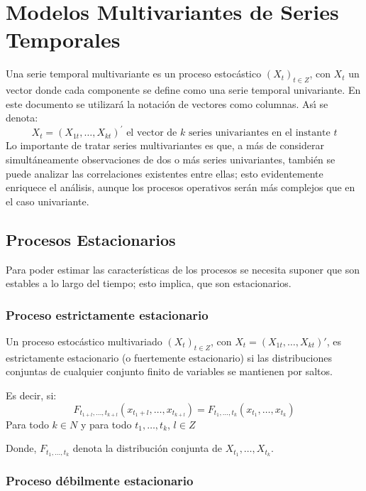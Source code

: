 \chapter{Modelos Multivariantes de Series Temporales}
\label{sec:mylabel2}

Una serie temporal multivariante es un proceso estoc\'{a}stico ${(X_{t})}_{t\in Z}$, con $X_{t}$ un vector donde cada componente se define como una serie temporal univariante. En este documento se utilizar\'{a} la notaci\'{o}n de vectores como columnas. As\'{\i} se denota:
\[
X_{t}=(X_{1t}, \ldots, X_{kt})^{'} \text{ el vector de $k$ series univariantes en el instante $t$}
\]
Lo importante de tratar series multivariantes es que, a m\'{a}s de considerar simult\'{a}neamente observaciones de dos o m\'{a}s series univariantes, tambi\'{e}n se puede analizar las correlaciones existentes entre ellas; esto evidentemente enriquece el an\'{a}lisis, aunque los procesos operativos ser\'{a}n m\'{a}s complejos que en el caso univariante.

\section{Procesos Estacionarios}
\label{subsec:mylabel5}

Para poder estimar las caracter\'{i}sticas de los procesos se necesita suponer que son estables a lo largo del tiempo; esto implica, que son estacionarios. 

\subsection{Proceso estrictamente estacionario}
\label{subsubsec:mylabel1}

Un proceso estoc\'{a}stico multivariado ${(X_{t})}_{t\in Z}$, con $X_{t}=(X_{1t},\ldots ,X_{kt})'$, es estrictamente estacionario (o fuertemente estacionario) si las distribuciones conjuntas de cualquier 
conjunto finito de variables se mantienen por saltos. 

Es decir, si:
\[
F_{t_{1+l},\ldots, t_{k+l}}\left( x_{t_{1}+l},\ldots, x_{t_{k+l}} \right)=
F_{t_{1},\ldots ,t_{k}}\left( x_{t_{1}},\ldots, x_{t_{k}} \right)
\]
Para todo $k\in N$ y para todo $t_{1},\ldots , t_{k}$, $l\in Z$ 

Donde, $F_{t_{1},\ldots ,t_{k}}$ denota la distribuci\'{o}n conjunta de $X_{t_{1}},\ldots , X_{t_{k}}$.

\subsection{Proceso d\'{e}bilmente estacionario}
\label{subsubsec:mylabel2}

